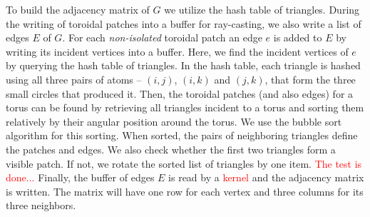 To build the adjacency matrix of $G$ we utilize the hash table of triangles.
During the writing of toroidal patches into a buffer for ray-casting, we also write a list of edges $E$ of $G$.
For each \textit{non-isolated} toroidal patch an edge $e$ is added to $E$ by writing its incident vertices into a buffer.
Here, we find the incident vertices of $e$ by querying the hash table of triangles.
In the hash table, each triangle is hashed using all three pairs of atoms -- $(i, j)$, $(i, k)$ and $(j, k)$, that form the three small circles that produced it.
Then, the toroidal patches (and also edges) for a torus can be found by retrieving all triangles incident to a torus and sorting them relatively by their angular position around the torus.
We use the bubble sort algorithm for this sorting.
When sorted, the pairs of neighboring triangles define the patches and edges.
We also check whether the first two triangles form a visible patch.
If not, we rotate the sorted list of triangles by one item.
\textcolor{red}{The test is done...}
Finally, the buffer of edges $E$ is read by a \textcolor{red}{kernel} and the adjacency matrix is written. 
The matrix will have one row for each vertex and three columns for its three neighbors.%

